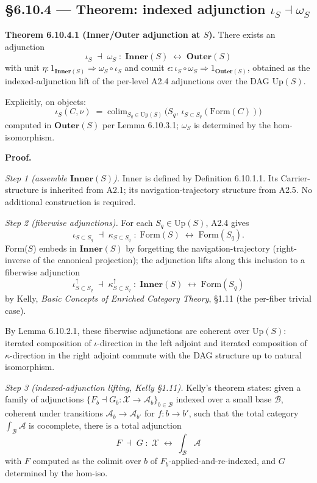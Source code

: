 \documentclass[11pt, openany]{book}
\begin{document}
\subsection{§6.10.4 --- Theorem: indexed adjunction $\iota_S \dashv \omega_S$}

\textbf{Theorem 6.10.4.1 (Inner/Outer adjunction at $S$).} There exists an adjunction
\[
\iota_S \;\dashv\; \omega_S \;:\; \mathbf{Inner}(S) \;\longleftrightarrow\; \mathbf{Outer}(S)
\]
with unit $\eta : 1_{\mathbf{Inner}(S)} \Rightarrow \omega_S \circ \iota_S$ and counit $\epsilon : \iota_S \circ \omega_S \Rightarrow 1_{\mathbf{Outer}(S)}$, obtained as the indexed-adjunction lift of the per-level A2.4 adjunctions over the DAG $\mathrm{Up}(S)$.

Explicitly, on objects:
\[
\iota_S(C, \nu) \;=\; \mathrm{colim}_{S_q \in \mathrm{Up}(S)} \, \bigl( S_q, \, \iota_{S \subset S_q}(\mathrm{Form}(C)) \bigr)
\]
computed in $\mathbf{Outer}(S)$ per Lemma 6.10.3.1; $\omega_S$ is determined by the hom-isomorphism.

\textbf{Proof.}

\textit{Step 1 (assemble $\mathbf{Inner}(S)$).} Inner is defined by Definition 6.10.1.1. Its Carrier-structure is inherited from A2.1; its navigation-trajectory structure from A2.5. No additional construction is required.

\textit{Step 2 (fiberwise adjunctions).} For each $S_q \in \mathrm{Up}(S)$, A2.4 gives
\[
\iota_{S \subset S_q} \;\dashv\; \kappa_{S \subset S_q} \;:\; \mathrm{Form}(S) \;\longleftrightarrow\; \mathrm{Form}(S_q).
\]
Form($S$) embeds in $\mathbf{Inner}(S)$ by forgetting the navigation-trajectory (right-inverse of the canonical projection); the adjunction lifts along this inclusion to a fiberwise adjunction
\[
\iota_{S \subset S_q}^\uparrow \;\dashv\; \kappa_{S \subset S_q}^\uparrow \;:\; \mathbf{Inner}(S) \;\longleftrightarrow\; \mathrm{Form}(S_q)
\]
by Kelly, \textit{Basic Concepts of Enriched Category Theory}, §1.11 (the per-fiber trivial case).

By Lemma 6.10.2.1, these fiberwise adjunctions are coherent over $\mathrm{Up}(S)$: iterated composition of $\iota$-direction in the left adjoint and iterated composition of $\kappa$-direction in the right adjoint commute with the DAG structure up to natural isomorphism.

\textit{Step 3 (indexed-adjunction lifting, Kelly §1.11).} Kelly's theorem states: given a family of adjunctions $\{F_b \dashv G_b : \mathcal{X} \to \mathcal{A}_b\}_{b \in \mathcal{B}}$ indexed over a small base $\mathcal{B}$, coherent under transitions $\mathcal{A}_b \to \mathcal{A}_{b'}$ for $f : b \to b'$, such that the total category $\int_{\mathcal{B}} \mathcal{A}$ is cocomplete, there is a total adjunction
\[
F \;\dashv\; G \;:\; \mathcal{X} \;\longleftrightarrow\; \int_{\mathcal{B}} \mathcal{A}
\]
with $F$ computed as the colimit over $b$ of $F_b$-applied-and-re-indexed, and $G$ determined by the hom-iso.
\end{document}
